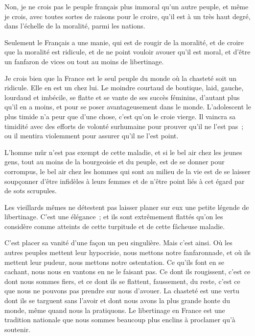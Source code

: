 \documentclass[french,twoside]{book} %
\begin{document}
Non, je ne crois pas le peuple français plus immoral qu’un autre peuple, et même je crois, avec toutes sortes de raisons pour le croire, qu’il est à un très haut degré, dans l’échelle de la moralité, parmi les nations.\par
Seulement le Français a une manie, qui est de rougir de la moralité, et de croire que la moralité est ridicule, et de ne point vouloir avouer qu’il est moral, et d’être un fanfaron de vices ou tout au moins de libertinage.\par
Je crois bien que la France est le seul peuple du  monde où la chasteté soit un ridicule. Elle en est un chez lui. Le moindre courtaud de boutique, laid, gauche, lourdaud et imbécile, se flatte et se vante de ses succès féminins, d’autant plus qu’il en a moins, et pour se poser avantageusement dans le monde. L’adolescent le plus timide n’a peur que d’une chose, c’est qu’on le croie vierge. Il vaincra sa timidité avec des efforts de volonté surhumaine pour prouver qu’il ne l’est pas ; ou il mentira violemment pour assurer qu’il ne l’est point.\par
L’homme mûr n’est pas exempt de cette maladie, et si le bel air chez les jeunes gens, tout au moins de la bourgeoisie et du peuple, est de se donner pour corrompus, le bel air chez les hommes qui sont au milieu de la vie est de se laisser soupçonner d’être infidèles à leurs femmes et de n’être point liés à cet égard par de sots scrupules.\par
Les vieillards mêmes ne détestent pas laisser planer sur eux une petite légende de libertinage. C’est une élégance ; et ils sont extrêmement flattés qu’on les considère comme atteints de cette turpitude et de cette fâcheuse maladie.\par
C’est placer sa vanité d’une façon un peu singulière. Mais c’est ainsi. Où les autres peuples mettent leur hypocrisie, nous mettons notre fanfaronnade, et où ils mettent leur pudeur, nous mettons  notre ostentation. Ce qu’ils font en se cachant, nous nous en vantons en ne le faisant pas. Ce dont ils rougissent, c’est ce dont nous sommes fiers, et ce dont ils se flattent, faussement, du reste, c’est ce que nous ne pouvons pas prendre sur nous d’avouer. La chasteté est une vertu dont ils se targuent sans l’avoir et dont nous avons la plus grande honte du monde, même quand nous la pratiquons. Le libertinage en France est une tradition nationale que nous sommes beaucoup plus enclins à proclamer qu’à soutenir.\par
\end{document}
